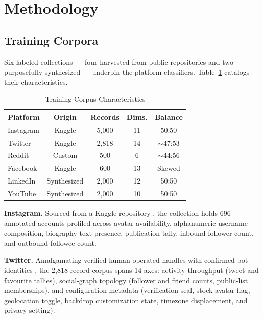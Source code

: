 \documentclass[conference]{IEEEtran}
\begin{document}
\section{Methodology}

\subsection{Training Corpora}

Six labeled collections --- four harvested from public repositories and two purposefully synthesized --- underpin the platform classifiers. Table~\ref{tab:datasets} catalogs their characteristics.

\begin{table}[htbp]
\caption{Training Corpus Characteristics}
\label{tab:datasets}
\centering
\begin{tabular}{lcccc}
\toprule
\textbf{Platform} & \textbf{Origin} & \textbf{Records} & \textbf{Dims.} & \textbf{Balance} \\
\midrule
Instagram & Kaggle\cite{instagram_dataset} & 5{,}000 & 11 & 50:50 \\
Twitter & Kaggle\cite{twitter_dataset} & 2{,}818 & 14 & $\sim$47:53 \\
Reddit & Custom\cite{reddit_dataset} & 500 & 6 & $\sim$44:56 \\
Facebook & Kaggle\cite{facebook_dataset} & 600 & 13 & Skewed \\
LinkedIn & Synthesized & 2{,}000 & 12 & 50:50 \\
YouTube & Synthesized & 2{,}000 & 10 & 50:50 \\
\bottomrule
\end{tabular}
\end{table}

\textbf{Instagram.} Sourced from a Kaggle repository \cite{instagram_dataset}, the collection holds 696 annotated accounts profiled across avatar availability, alphanumeric username composition, biography text presence, publication tally, inbound follower count, and outbound followee count.

\textbf{Twitter.} Amalgamating verified human-operated handles with confirmed bot identities \cite{twitter_dataset}, the 2,818-record corpus spans 14 axes: activity throughput (tweet and favourite tallies), social-graph topology (follower and friend counts, public-list memberships), and configuration metadata (verification seal, stock avatar flag, geolocation toggle, backdrop customization state, timezone displacement, and privacy setting).
\end{document}
